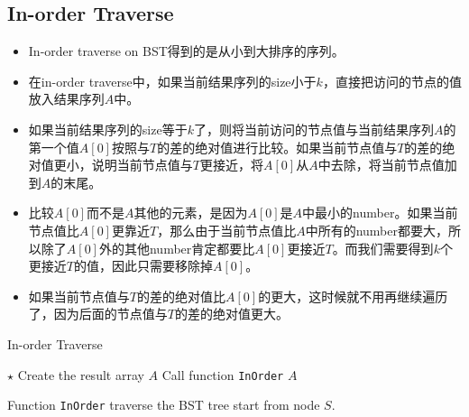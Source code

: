 \subsection{In-order Traverse}
\begin{itemize}
\item In-order traverse on BST得到的是从小到大排序的序列。
\item 在in-order traverse中，如果当前结果序列的size小于$k$，直接把访问的节点的值放入结果序列$A$中。
\item 如果当前结果序列的size等于$k$了，则将当前访问的节点值与当前结果序列$A$的第一个值$A[0]$按照与$T$的差的绝对值进行比较。如果当前节点值与$T$的差的绝对值更小，说明当前节点值与$T$更接近，将$A[0]$从$A$中去除，将当前节点值加到$A$的末尾。
\item 比较$A[0]$而不是$A$其他的元素，是因为$A[0]$是$A$中最小的number。如果当前节点值比$A[0]$更靠近$T$，那么由于当前节点值比$A$中所有的number都要大，所以除了$A[0]$外的其他number肯定都要比$A[0]$更接近$T$。而我们需要得到$k$个更接近$T$的值，因此只需要移除掉$A[0]$。
\item 如果当前节点值与$T$的差的绝对值比$A[0]$的更大，这时候就不用再继续遍历了，因为后面的节点值与$T$的差的绝对值更大。
\end{itemize}
\setcounter{algorithm}{0}
\begin{algorithm}[H]
\caption{In-order Traverse}
\begin{algorithmic}[1]
\State $\star$ Create the result array $A$
\State {} \Comment Call function \texttt{InOrder}
\State \Return $A$
\EndProcedure
\end{algorithmic}
\end{algorithm}
Function \texttt{InOrder} traverse the BST tree start from node $S$.

